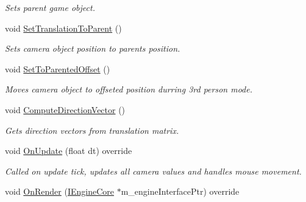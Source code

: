 \begin{DoxyCompactItemize}
\begin{DoxyCompactList}\small\item\em Sets parent game object. \end{DoxyCompactList}\item 
\mbox{\label{class_camera_component_aa0d12f5b387e651246a0679669501440}} 
void \mbox{\hyperlink{class_camera_component_aa0d12f5b387e651246a0679669501440}{Set\+Translation\+To\+Parent}} ()
\begin{DoxyCompactList}\small\item\em Sets camera object position to parent\textquotesingle{}s position. \end{DoxyCompactList}\item 
\mbox{\label{class_camera_component_a0fea5ba248b0d18b9c412429092504b6}} 
void \mbox{\hyperlink{class_camera_component_a0fea5ba248b0d18b9c412429092504b6}{Set\+To\+Parented\+Offset}} ()
\begin{DoxyCompactList}\small\item\em Moves camera object to offseted position durring 3rd person mode. \end{DoxyCompactList}\item 
\mbox{\label{class_camera_component_a09c8c13788174831d14f6b600da0aa73}} 
void \mbox{\hyperlink{class_camera_component_a09c8c13788174831d14f6b600da0aa73}{Compute\+Direction\+Vector}} ()
\begin{DoxyCompactList}\small\item\em Gets direction vectors from translation matrix. \end{DoxyCompactList}\item 
\mbox{\label{class_camera_component_aa0391037fd478ea1a602835ea64091ba}} 
void \mbox{\hyperlink{class_camera_component_aa0391037fd478ea1a602835ea64091ba}{On\+Update}} (float dt) override
\begin{DoxyCompactList}\small\item\em Called on update tick, updates all camera values and handles mouse movement. \end{DoxyCompactList}\item 
\mbox{\label{class_camera_component_a4ef61a586b2c0a3e975150263d31d68b}} 
void \mbox{\hyperlink{class_camera_component_a4ef61a586b2c0a3e975150263d31d68b}{On\+Render}} (\mbox{\hyperlink{class_i_engine_core}{I\+Engine\+Core}} $\ast$m\+\_\+engine\+Interface\+Ptr) override

\end{DoxyCompactItemize}

